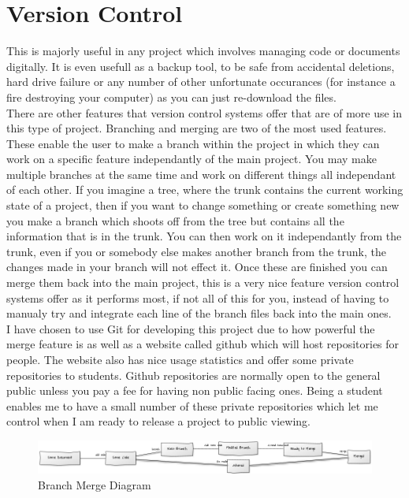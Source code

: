 \section{Version Control}
This is majorly useful in any project which involves managing code or documents digitally.  It is even usefull as a backup tool, to be safe from accidental deletions, hard drive failure or any number of other unfortunate occurances (for instance a fire destroying your computer) as you can just re-download the files.
\\There are other features that version control systems offer that are of more use in this type of project.  Branching and merging are two of the most used features.  These enable the user to make a branch within the project in which they can work on a specific feature independantly of the main project.  You may make multiple branches at the same time and work on different things all independant of each other.  If you imagine a tree, where the trunk contains the current working state of a project, then if you want to change something or create something new you make a branch which shoots off from the tree but contains all the information that is in the trunk.  You can then work on it independantly from the trunk, even if you or somebody else makes another branch from the trunk, the changes made in your branch will not effect it.  Once these are finished you can merge them back into the main project, this is a very nice feature version control systems offer as it performs most, if not all of this for you, instead of having to manualy try and integrate each line of the branch files back into the main ones.
\\I have chosen to use Git for developing this project due to how powerful the merge feature is as well as a website called github \cite{github} which will host repositories for people.  The website also has nice usage statistics and offer some private repositories to students.  Github repositories are normally open to the general public unless you pay a fee for having non public facing ones.  Being a student enables me to have a small number of these private repositories which let me control when I am ready to release a project to public viewing.
\begin{figure}[h]
\centering
        \includegraphics[width=6.0in] {Images/git-branch-merge.png}
        \caption{Branch Merge Diagram}
        \label{Branch Merge Diagram}
\end{figure}

